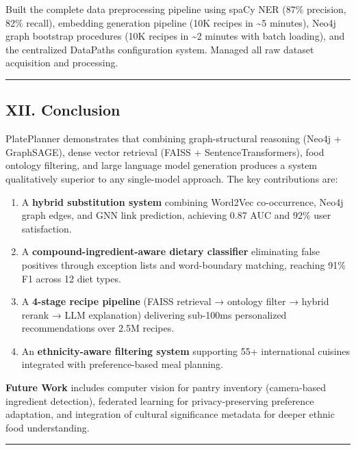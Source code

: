 \documentclass[10pt,conference,compsoc]{IEEEtran}
\begin{document}
Built the complete data preprocessing pipeline using spaCy NER (87\%
precision, 82\% recall), embedding generation pipeline (10K recipes in
\textasciitilde5 minutes), Neo4j graph bootstrap procedures (10K recipes
in \textasciitilde2 minutes with batch loading), and the centralized
DataPaths configuration system. Managed all raw dataset acquisition and
processing.

\begin{center}\rule{0.5\linewidth}{0.5pt}\end{center}

\subsection{XII. Conclusion}\label{xii.-conclusion}

PlatePlanner demonstrates that combining graph-structural reasoning
(Neo4j + GraphSAGE), dense vector retrieval (FAISS +
SentenceTransformers), food ontology filtering, and large language model
generation produces a system qualitatively superior to any single-model
approach. The key contributions are:

\begin{enumerate}
\def\labelenumi{\arabic{enumi}.}
\tightlist
\item
  A \textbf{hybrid substitution system} combining Word2Vec
  co-occurrence, Neo4j graph edges, and GNN link prediction, achieving
  0.87 AUC and 92\% user satisfaction.
\item
  A \textbf{compound-ingredient-aware dietary classifier} eliminating
  false positives through exception lists and word-boundary matching,
  reaching 91\% F1 across 12 diet types.
\item
  A \textbf{4-stage recipe pipeline} (FAISS retrieval → ontology filter
  → hybrid rerank → LLM explanation) delivering sub-100ms personalized
  recommendations over 2.5M recipes.
\item
  An \textbf{ethnicity-aware filtering system} supporting 55+
  international cuisines integrated with preference-based meal planning.
\end{enumerate}

\textbf{Future Work} includes computer vision for pantry inventory
(camera-based ingredient detection), federated learning for
privacy-preserving preference adaptation, and integration of cultural
significance metadata for deeper ethnic food understanding.

\begin{center}\rule{0.5\linewidth}{0.5pt}\end{center}
\end{document}
